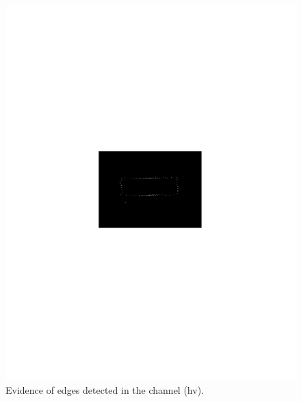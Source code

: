 \documentclass[conference]{IEEEtran}
\begin{document}
{{{{\begin{figure}[hbt]
	\includegraphics[scale=0.75]{flevoland_hv_evid_crop.pdf}
	\vspace{-6.0cm}
	\caption{Evidence of edges detected in the channel (hv).}	
\label{fig_03}
\end{figure}
\begin{figure}[hbt]

\end{figure}}}}}
\end{document}
